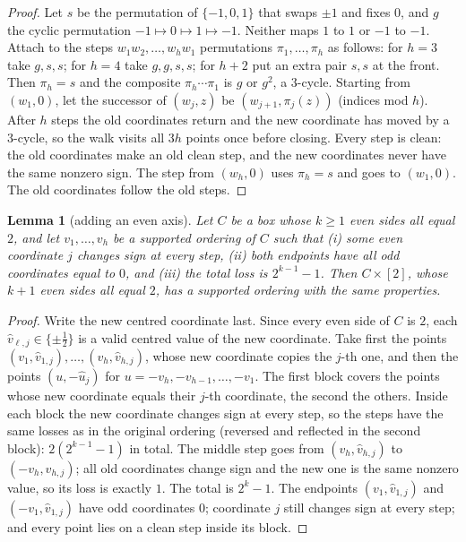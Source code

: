 \documentclass[11pt]{article}
\newtheorem{lemma}{Lemma}
\theoremstyle{remark}
\begin{document}
\begin{proof}
Let $s$ be the permutation of $\{-1,0,1\}$ that swaps $\pm1$ and fixes $0$, and
$g$ the cyclic permutation $-1\mapsto0\mapsto1\mapsto-1$. Neither maps $1$ to
$1$ or $-1$ to $-1$. Attach to the steps $w_1w_2,\dots,w_hw_1$ permutations
$\pi_1,\dots,\pi_h$ as follows: for $h=3$ take $g,s,s$; for $h=4$ take
$g,g,s,s$; for $h+2$ put an extra pair $s,s$ at the front. Then $\pi_h=s$ and
the composite $\pi_h\cdots\pi_1$ is $g$ or $g^2$, a $3$-cycle. Starting from
$(w_1,0)$, let the successor of $(w_j,z)$ be $(w_{j+1},\pi_j(z))$ (indices mod
$h$). After $h$ steps the old coordinates return and the new coordinate has
moved by a $3$-cycle, so the walk visits all $3h$ points once before closing.
Every step is clean: the old coordinates make an old clean step, and the new
coordinates never have the same nonzero sign. The step from $(w_h,0)$ uses
$\pi_h=s$ and goes to $(w_1,0)$. The old coordinates follow the old steps.
\end{proof}

\begin{lemma}[adding an even axis]\label{lem:even}
Let $C$ be a box whose $k\ge1$ even sides all equal $2$, and let
$v_1,\dots,v_h$ be a supported
ordering of $C$ such that (i) some even coordinate $j$ changes sign at every
step, (ii) both endpoints have all odd coordinates equal to $0$, and (iii) the
total loss is $2^{k-1}-1$. Then $C\times[2]$, whose $k+1$ even sides all equal $2$, has a
supported ordering with the same properties.
\end{lemma}

\begin{proof}
Write the new centred coordinate last. Since every even side of $C$ is $2$,
each $\hat v_{\ell,j}\in\{\pm\frac12\}$ is a valid centred value of the new
coordinate. Take first the points
$(v_1,\hat v_{1,j}),\dots,(v_h,\hat v_{h,j})$, whose new coordinate copies
the $j$-th one, and then the points $(u,-\hat u_j)$ for
$u=-v_h,-v_{h-1},\dots,-v_1$. The first block covers the points whose new
coordinate equals their $j$-th coordinate, the second the others. Inside each
block the new coordinate changes sign at every step, so the steps have the
same losses as in the original ordering (reversed and reflected in the second
block): $2(2^{k-1}-1)$ in total. The middle step goes from
$(v_h,\hat v_{h,j})$ to $(-v_h,\hat v_{h,j})$; all old coordinates change sign
and the new one is the same nonzero value, so its loss is exactly $1$. The
total is $2^k-1$. The endpoints $(v_1,\hat v_{1,j})$ and $(-v_1,\hat v_{1,j})$
have odd coordinates $0$; coordinate $j$ still changes sign at every step; and
every point lies on a clean step inside its block.
\end{proof}
\end{document}
